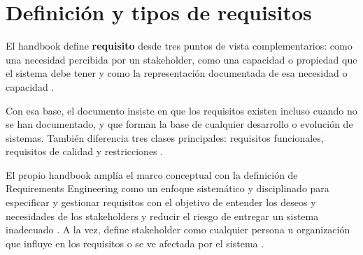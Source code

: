 \section{Definici\'on y tipos de requisitos}
El handbook define \textbf{requisito} desde tres puntos de vista complementarios: como una necesidad percibida por un stakeholder, como una capacidad o propiedad que el sistema debe tener y como la representaci\'on documentada de esa necesidad o capacidad \cite[p.~10]{cpre}.

Con esa base, el documento insiste en que los requisitos existen incluso cuando no se han documentado, y que forman la base de cualquier desarrollo o evoluci\'on de sistemas. Tambi\'en diferencia tres clases principales: requisitos funcionales, requisitos de calidad y restricciones \cite[p.~10]{cpre}.

El propio handbook ampl\'ia el marco conceptual con la definici\'on de Requirements Engineering como un enfoque sistem\'atico y disciplinado para especificar y gestionar requisitos con el objetivo de entender los deseos y necesidades de los stakeholders y reducir el riesgo de entregar un sistema inadecuado \cite[pp.~10--11]{cpre}. A la vez, define stakeholder como cualquier persona u organizaci\'on que influye en los requisitos o se ve afectada por el sistema \cite[p.~11]{cpre}.